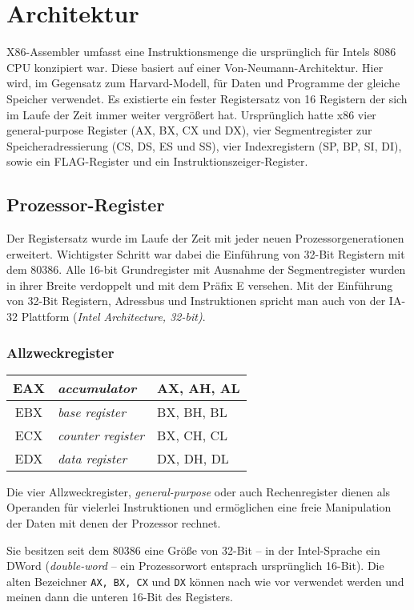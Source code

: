 \section{Architektur}
X86-Assembler umfasst eine Instruktionsmenge die ursprünglich für Intels 8086 CPU konzipiert war. Diese basiert auf einer Von-Neumann-Architektur. Hier wird, im Gegensatz zum Harvard-Modell, für Daten und Programme der gleiche Speicher verwendet. Es existierte ein fester Registersatz von 16 Registern der sich im Laufe der Zeit immer weiter vergrößert hat. Ursprünglich hatte x86 vier general-purpose Register (AX, BX, CX und DX), vier Segmentregister zur Speicheradressierung (CS, DS, ES und SS), vier Indexregistern (SP, BP, SI, DI), sowie ein FLAG-Register und ein Instruktionszeiger-Register.

\subsection{Prozessor-Register}

Der Registersatz wurde im Laufe der Zeit mit jeder neuen Prozessorgenerationen erweitert. Wichtigster Schritt war dabei die Einführung von 32-Bit Registern mit dem 80386. Alle 16-bit Grundregister mit Ausnahme der Segmentregister wurden in ihrer Breite verdoppelt und mit dem Präfix E versehen. Mit der Einführung von 32-Bit Registern, Adressbus und Instruktionen spricht man auch von der IA-32 Plattform (\emph{Intel Architecture, 32-bit)}.

\subsubsection{Allzweckregister}

\begin{tabular}{|c|l|l|}
\hline EAX & \emph{accumulator} & AX, AH, AL \\
\hline EBX & \emph{base register} & BX, BH, BL \\
\hline ECX & \emph{counter register} & BX, CH, CL \\
\hline EDX & \emph{data register} & DX, DH, DL \\
\hline \end{tabular}

Die vier Allzweckregister, \emph{general-purpose} oder auch Rechenregister dienen als Operanden für vielerlei Instruktionen und ermöglichen eine freie Manipulation der Daten mit denen der Prozessor rechnet.

Sie besitzen seit dem 80386 eine Größe von 32-Bit – in der Intel-Sprache ein DWord (\emph{double-word} -- ein Prozessorwort entsprach ursprünglich 16-Bit). Die alten Bezeichner {\tt AX, BX, CX} und {\tt DX} können nach wie vor verwendet werden und meinen dann die unteren 16-Bit des Registers.

